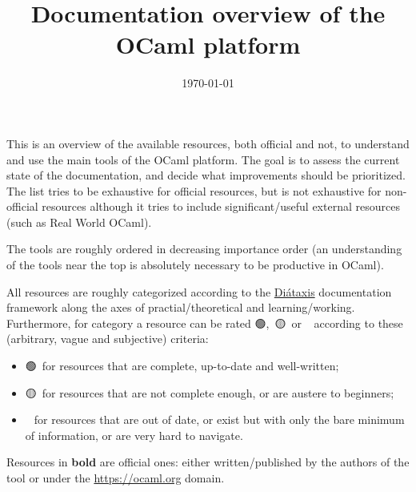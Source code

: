 \documentclass{article}
\title{Documentation overview of the OCaml platform}
\date{\today}
\newcommand{\good}{🟢}
\newcommand{\meh}{🟡}
\newcommand{\bad}{🔴}
\begin{document}
\maketitle
This is an overview of the available resources, both official and not, to
understand and use the main tools of the OCaml platform. The goal is to assess
the current state of the documentation, and decide what improvements should be
prioritized. The list tries to be exhaustive for official resources, but is not
exhaustive for non-official resources although it tries to include
significant/useful external resources (such as Real World OCaml).

The tools are roughly ordered in decreasing importance order (an understanding
of the tools near the top is absolutely necessary to be productive in OCaml).

All resources are roughly categorized according to the
\href{https://diataxis.fr/}{Diátaxis} documentation framework along the axes of
practial/theoretical and learning/working. Furthermore, for category a resource
can be rated \good,~\meh~or \bad~according to these (arbitrary, vague and
subjective) criteria:
\begin{itemize}
  \item \good~for resources that are complete, up-to-date and well-written;
  \item \meh~for resources that are not complete enough, or are austere to
    beginners;
  \item \bad~for resources that are out of date, or exist but with only the bare
    minimum of information, or are very hard to navigate.
\end{itemize}

Resources in \textbf{bold} are official ones: either written/published by the
authors of the tool or under the \url{https://ocaml.org} domain.
\end{document}
